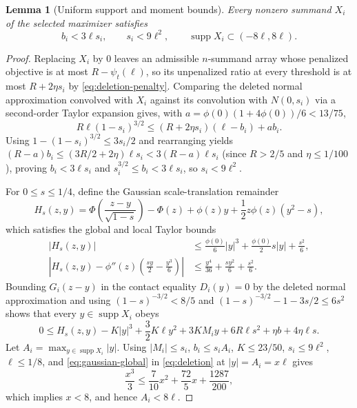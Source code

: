 \documentclass[11pt]{article}
\numberwithin{equation}{section}
\newtheorem{lemma}[theorem]{Lemma}
\theoremstyle{remark}
\DeclareMathOperator{\supp}{supp}
\newcommand{\phz}{\phi(0)}
\begin{document}
\begin{lemma}[Uniform support and moment bounds]\label{lem:support}
Every nonzero summand $X_i$ of the selected maximizer satisfies
\begin{equation}\label{eq:support}
 b_i<3\ell s_i,\qquad s_i<9\ell^2,
                 \qquad\supp X_i\subset(-8\ell,8\ell).
\end{equation}
\end{lemma}
\begin{proof}
Replacing $X_i$ by $0$ leaves an admissible $n$-summand array whose penalized
objective is at most $R-\psi_t(\ell)$, so its unpenalized ratio at every
threshold is at most $R+2\eta s_i$ by \eqref{eq:deletion-penalty}. Comparing
the deleted normal approximation convolved with $X_i$ against its convolution
with $N(0,s_i)$ via a second-order Taylor expansion gives, with
$a=\phz(1+4\phz)/6<13/75$,
\[
 R\ell(1-s_i)^{3/2}\le(R+2\eta s_i)(\ell-b_i)+ab_i.
\]
Using $1-(1-s_i)^{3/2}\le3s_i/2$ and rearranging yields
$(R-a)b_i\le(3R/2+2\eta)\ell s_i<3(R-a)\ell s_i$ (since $R>2/5$ and
$\eta\le1/100$), proving $b_i<3\ell s_i$ and $s_i^{3/2}\le b_i<3\ell s_i$, so
$s_i<9\ell^2$.

For $0\le s\le1/4$, define the Gaussian scale-translation remainder
\[
 H_s(z,y)=\Phi\!\left(\frac{z-y}{\sqrt{1-s}}\right)-\Phi(z)
                     +\phi(z)y+\frac12z\phi(z)(y^2-s),
\]
which satisfies the global and local Taylor bounds
\begin{align}
 |H_s(z,y)|&\le\frac{\phz}{6}|y|^3+\frac{\phz}{2}s|y|+\frac{s^2}{6},    \label{eq:gaussian-global}\\
 \left|H_s(z,y)-\phi''(z)\left(\frac{sy}2-\frac{y^3}6\right)\right|
       &\le \frac{y^4}{36}+\frac{sy^2}6+\frac{s^2}6.                   \label{eq:gaussian-local}
\end{align}
Bounding $G_i(z-y)$ in the contact equality $D_i(y)=0$ by the deleted normal
approximation and using $(1-s)^{-3/2}<8/5$ and $(1-s)^{-3/2}-1-3s/2\le6s^2$
shows that every $y\in\supp X_i$ obeys
\begin{equation}\label{eq:deletion}
 0\le H_s(z,y)-K|y|^3+\frac32K\ell y^2+3KM_i y
                       +6R\ell s^2+\eta b+4\eta\ell s.
\end{equation}
Let $A_i=\max_{y\in\supp X_i}|y|$. Using $|M_i|\le s_i$, $b_i\le s_iA_i$,
$K\le23/50$, $s_i\le9\ell^2$, $\ell\le1/8$, and \eqref{eq:gaussian-global}
in \eqref{eq:deletion} at $|y|=A_i=x\ell$ gives
\[
 \frac{x^3}3\le\frac7{10}x^2+\frac{72}5x+\frac{1287}{200},
\]
which implies $x<8$, and hence $A_i<8\ell$.
\end{proof}
\end{document}
